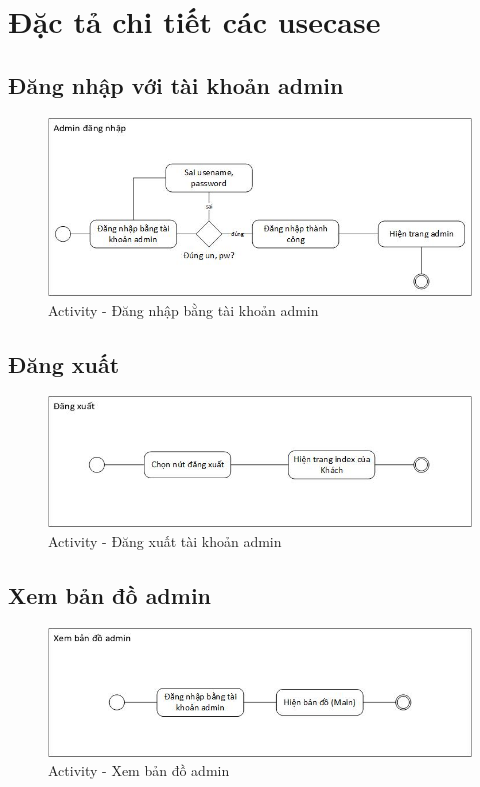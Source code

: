 	\section{Đặc tả chi tiết các usecase}
	\subsection{Đăng nhập với tài khoản admin}
		\begin{figure}[H]
			\centering
			\includegraphics[scale=.75]{Graphics/activity-login}
			\caption{Activity - Đăng nhập bằng tài khoản admin}
		\end{figure}
		
	\subsection{Đăng xuất}
		\begin{figure}[H]
			\centering
			\includegraphics[scale=.75]{Graphics/activity-logout}
			\caption{Activity - Đăng xuất tài khoản admin}
		\end{figure}
				
	\subsection{Xem bản đồ admin}
		\begin{figure}[H]
			\centering
			\includegraphics[scale=.75]{Graphics/activity-viewmap-admin}
			\caption{Activity - Xem bản đồ admin}
		\end{figure}
		
